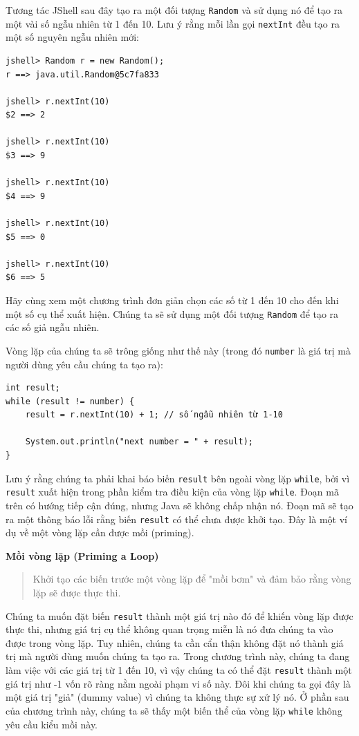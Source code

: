 Tương tác JShell sau đây tạo ra một đối tượng \texttt{Random} và sử dụng nó để tạo ra một vài số ngẫu nhiên từ 1 đến 10. Lưu ý rằng mỗi lần gọi \texttt{nextInt} đều tạo ra một số nguyên ngẫu nhiên mới:
\begin{verbatim}
jshell> Random r = new Random();
r ==> java.util.Random@5c7fa833 
 
jshell> r.nextInt(10)
$2 ==> 2 
 
jshell> r.nextInt(10)
$3 ==> 9 
 
jshell> r.nextInt(10)
$4 ==> 9 
 
jshell> r.nextInt(10)
$5 ==> 0 
 
jshell> r.nextInt(10)
$6 ==> 5
\end{verbatim}

Hãy cùng xem một chương trình đơn giản chọn các số từ 1 đến 10 cho đến khi một số cụ thể xuất hiện. Chúng ta sẽ sử dụng một đối tượng \texttt{Random} để tạo ra các số giả ngẫu nhiên.

Vòng lặp của chúng ta sẽ trông giống như thế này (trong đó \texttt{number} là giá trị mà người dùng yêu cầu chúng ta tạo ra):
\begin{verbatim}
int result;
while (result != number) {
    result = r.nextInt(10) + 1; // số ngẫu nhiên từ 1-10

    System.out.println("next number = " + result);
}
\end{verbatim}

Lưu ý rằng chúng ta phải khai báo biến \texttt{result} bên ngoài vòng lặp \texttt{while}, bởi vì \texttt{result} xuất hiện trong phần kiểm tra điều kiện của vòng lặp \texttt{while}. Đoạn mã trên có hướng tiếp cận đúng, nhưng Java sẽ không chấp nhận nó. Đoạn mã sẽ tạo ra một thông báo lỗi rằng biến \texttt{result} có thể chưa được khởi tạo. Đây là một ví dụ về một vòng lặp cần được mồi (priming).

\textbf{Mồi vòng lặp (Priming a Loop)}
\begin{quote}
Khởi tạo các biến trước một vòng lặp để "mồi bơm" và đảm bảo rằng vòng lặp sẽ được thực thi.
\end{quote}

Chúng ta muốn đặt biến \texttt{result} thành một giá trị nào đó để khiến vòng lặp được thực thi, nhưng giá trị cụ thể không quan trọng miễn là nó đưa chúng ta vào được trong vòng lặp. Tuy nhiên, chúng ta cần cẩn thận không đặt nó thành giá trị mà người dùng muốn chúng ta tạo ra. Trong chương trình này, chúng ta đang làm việc với các giá trị từ 1 đến 10, vì vậy chúng ta có thể đặt \texttt{result} thành một giá trị như -1 vốn rõ ràng nằm ngoài phạm vi số này. Đôi khi chúng ta gọi đây là một giá trị "giả" (dummy value) vì chúng ta không thực sự xử lý nó. Ở phần sau của chương trình này, chúng ta sẽ thấy một biến thể của vòng lặp \texttt{while} không yêu cầu kiểu mồi này.

